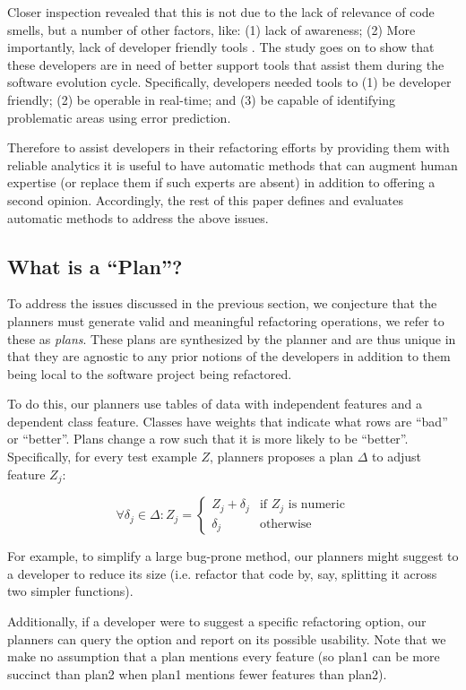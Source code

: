 \documentclass{sig-alternate}
\begin{document}
Closer inspection revealed that this is not due to the lack of relevance of code smells, but a number of other factors, like: (1) lack of awareness; (2) More importantly, lack of developer friendly tools \cite{}. The study goes on to show that these developers are in need of better support tools that assist them during the software evolution cycle.  Specifically, developers needed tools to (1) be developer friendly; (2) be operable in real-time; and (3) be capable of identifying problematic areas using error prediction.

Therefore to assist developers in their refactoring efforts by providing them with reliable analytics it is useful to have automatic methods that can augment human expertise (or replace them if such experts are absent) in addition to offering a second opinion. Accordingly, the rest of this paper defines and evaluates automatic methods to address the above issues.
  

\subsection{What is a ``Plan''?}
To address the issues discussed in the previous section, we conjecture that the planners must generate valid and meaningful refactoring operations, we refer to these as \textit{plans}. These plans are synthesized by the planner and are thus unique in that they are agnostic to any prior notions of the developers in addition to them being local to the software project being refactored.  

To do this, our planners use tables of data with independent features and a dependent class feature. Classes have weights  that  indicate  what rows are ``bad'' or ``better''. Plans  change   a row such that it is more likely to be ``better''. Specifically, for every test example $Z$,   planners proposes a  plan $\Delta$ to adjust   feature $Z_j$:

{\small\[
\forall \delta_j \in \Delta :  Z_j =  
\begin{cases}
     Z_j + \delta_j& \text{if $Z_j$ is numeric}\\
    \delta_j              & \text{otherwise}
\end{cases}
\]}

For example, to simplify a  large bug-prone  method, our planners might suggest to a developer to reduce its size (i.e.  refactor that code by, say, splitting it across two simpler functions).

Additionally, if a developer were to suggest a specific refactoring option, our planners can query the option and report on its possible usability. Note that we make no assumption that a plan mentions every feature (so plan1 can be  more succinct than plan2 when plan1  mentions fewer features than plan2).
\end{document}
